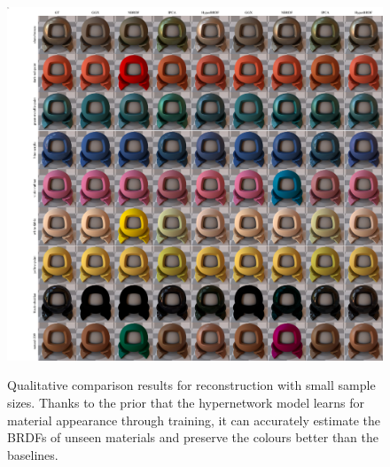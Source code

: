 \begin{figure}[t]
  {\includegraphics[width=0.9\linewidth]{Chapters/hyperbrdf-figs/qual_comp_ggx_2.pdf}}
\\
   \caption{Qualitative comparison results for reconstruction with small sample sizes. Thanks to the prior that the hypernetwork model learns for material appearance through training, it can accurately estimate the BRDFs of unseen materials and preserve the colours better than the baselines.}  

   \label{fig:imp_comp_upt}
\end{figure}

